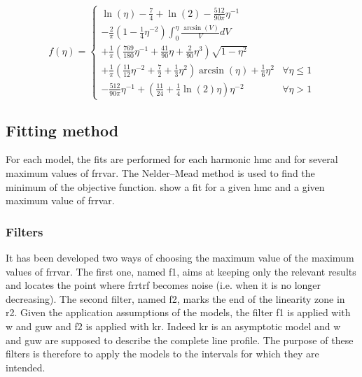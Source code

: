 \medskip

\begin{equation}
  f(\eta) =
    \begin{cases}
      \ln(\eta) - \frac{7}{4} + \ln(2) - \frac{512}{90 \pi} \eta^{-1} \\[5mm]
      - \frac{2}{\pi} \left( 1 - \frac{1}{4}\eta^{-2} \right) \int_0^\eta \frac{\arcsin(V)}{V} dV \\[5mm]
      + \frac{1}{\pi} \left( \frac{769}{180} \eta^{-1} + \frac{41}{90} \eta + \frac{2}{90}\eta^3 \right) \sqrt{ 1 - \eta^2 } \\[5mm]
      + \frac{1}{\pi} \left( \frac{11}{12} \eta^{-2} + \frac{7}{2} + \frac{1}{3} \eta^2 \right) \arcsin(\eta) + \frac{1}{6} \eta^2
      & \forall \eta \leq 1 \\[1cm]
      - \frac{512}{90 \pi} \eta^{-1} + \left( \frac{11}{24} + \frac{1}{4} \ln(2) \eta \right) \eta^{-2}
      & \forall \eta > 1
    \end{cases}
\end{equation}

\subsection{Fitting method}

For each model, the fits are performed for each harmonic \gls{hmc} and for several maximum values of \gls{frrvar}.
The Nelder–Mead method is used to find the minimum of the objective function.
 show a fit for a given \gls{hmc} and a given maximum value of \gls{frrvar}.


\subsubsection{Filters}\label{sec:filters}

It has been developed two ways of choosing the maximum value of the maximum values of \gls{frrvar}.
The first one, named \gls{f1}, aims at keeping only the relevant results and locates the point where \gls{frrtrf} becomes noise (i.e. when it is no longer decreasing).
The second filter, named \gls{f2}, marks the end of the linearity zone in \gls{r2}.
Given the application assumptions of the models, the filter \gls{f1} is applied with \gls{w} and \gls{guw} and \gls{f2} is applied with \gls{kr}.
Indeed \gls{kr} is an asymptotic model and \gls{w} and \gls{guw} are supposed to describe the complete line profile.
The purpose of these filters is therefore to apply the models to the intervals for which they are intended.

